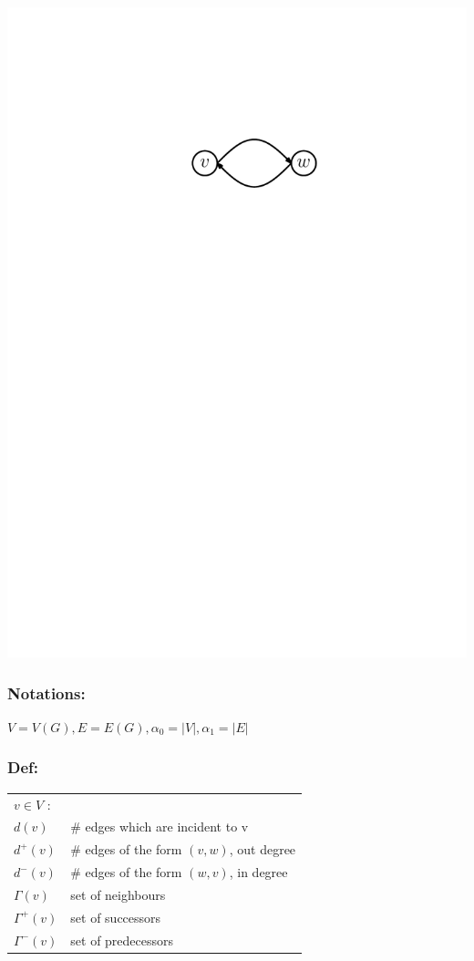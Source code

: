 \includegraphics[scale=.5]{01_graph_theory/pics/directed-graph_multiple-edges.pdf} \\

\subsubsection*{Notations:}
$V = V(G), E = E(G), \alpha_0 = |V|, \alpha_1 = |E|$ 

\subsubsection*{Def:}

\begin{tabular}{l l}
$v \in V$ : \\
$d(v)$		& \# edges which are incident to v \\

$d^+(v)$	& \# edges of the form $(v,w)$, out degree \\
$d^-(v)$	& \# edges of the form $(w,v)$, in degree \\

$\Gamma(v)$ & set of neighbours \\
$\Gamma^+(v)$ & set of successors \\
$\Gamma^-(v)$ & set of predecessors \\

\end{tabular}

